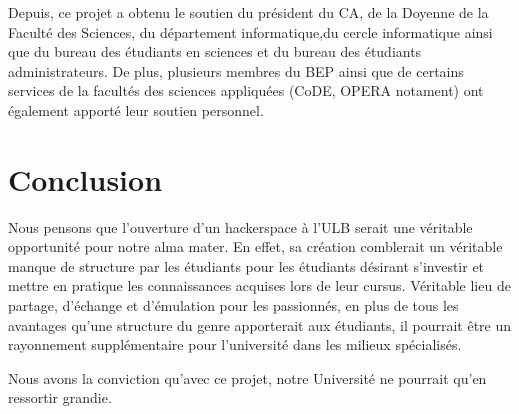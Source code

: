 \documentclass{article}
\begin{document}
Depuis, ce projet a obtenu le soutien du président du CA, de la Doyenne de la Faculté des Sciences, du département informatique,du 
cercle informatique ainsi que du bureau des étudiants en sciences et du bureau des étudiants administrateurs.
De plus, plusieurs membres du BEP ainsi que de certains services de la facultés
des sciences appliquées (CoDE, OPERA notament) ont également apporté leur soutien personnel.

\section{Conclusion}
Nous pensons que l'ouverture d'un hackerspace à l'ULB serait une véritable opportunité pour notre alma mater. En effet, sa création comblerait un véritable manque de structure par les étudiants pour les étudiants désirant s'investir et mettre en pratique les connaissances acquises lors de leur cursus. Véritable lieu de partage, d'échange et d'émulation pour les passionnés, en plus de tous les avantages qu'une structure du genre apporterait aux étudiants, il pourrait être un rayonnement supplémentaire pour l'université dans les milieux spécialisés.

Nous avons la conviction qu'avec ce projet, notre Université ne pourrait qu'en ressortir grandie.
\end{document}
